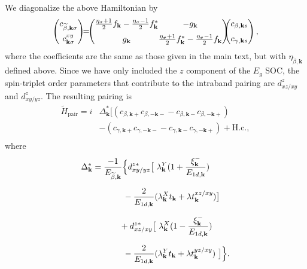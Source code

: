 \documentclass[%
reprint,
superscriptaddress,
 amsmath,amssymb,
 aps,
prb,
nobalancelastpage,
]{revtex4-2}
\begin{document}
We diagonalize the above Hamiltonian by
\begin{equation} \label{appendix_trsf}
\begin{aligned}
\begin{pmatrix}
   c_{\widetilde{\beta},\textbf{k}\sigma} \\[6pt]
   c^{xy}_{\textbf{k}\sigma} \\
 \end{pmatrix}\hspace{-1.5mm}
 \setlength\arraycolsep{0.01mm}
 = \hspace{-1.5mm}\begin{pmatrix} 
    \frac{\eta_{\sigma}+1}{2}f_{\textbf{k}}-\frac{\eta_{\sigma}-1}{2}f_{\textbf{k}}^{*} & -g_{\textbf{k}}  \\[6pt]
  g_{\textbf{k}} & \frac{\eta_{\sigma}+1}{2}f_{\textbf{k}}^{*}-\frac{\eta_{\sigma}-1}{2}f_{\textbf{k}}
\end{pmatrix}\hspace{-2.5mm}
\begin{pmatrix}
   c_{\beta,\textbf{k}s} \\[6pt]
   c_{\gamma,\textbf{k}s} \\
 \end{pmatrix},
\end{aligned}
\end{equation}
where the coefficients are the same as those given in the main text, but with $\eta_{\widetilde{\beta},\textbf{k}}$ defined above. Since we have only included the $z$ component of the $E_{g}$ SOC, the spin-triplet order parameters that contribute to the intraband pairing are $d_{xz/xy}^{z}$ and $d_{xy/yz}^{z}$. The resulting pairing is
\begin{equation}
\begin{aligned}
    \widetilde{H}_{\text{pair}} = i&\Delta_{\textbf{k}}^{*}\bigl[(c_{\beta,\textbf{k}+}c_{\beta,-\textbf{k}-} -c_{\beta,\textbf{k}-}c_{\beta,-\textbf{k}+}) \\[6pt]&- (c_{\gamma,\textbf{k}+}c_{\gamma,-\textbf{k}-} -c_{\gamma,\textbf{k}-}c_{\gamma,-\textbf{k}+}) + \text{H.c.},\\[6pt]
\end{aligned}
\end{equation}
where
\begin{equation}
\begin{aligned}
\Delta_{\textbf{k}}^{*} =\frac{-1}{E_{\widetilde{\beta},\textbf{k}}}\Big\{&d_{xy/yz}^{z*}\bigl[~\lambda_{\textbf{k}}^{Y}(1+\frac{\xi_{\textbf{k}}^{-}}{E_{1d,\textbf{k}}})\\[6pt]&\hspace{-2mm}-\frac{2}{E_{1d,\textbf{k}}}(\lambda_{\textbf{k}}^{X}t_{\textbf{k}} + \lambda t_{\textbf{k}}^{xz/xy})\bigr] \\[6pt]&\hspace{-3.5mm}+d_{xz/xy}^{z*}\bigl[~\lambda_{\textbf{k}}^{X}(1-\frac{\xi_{\textbf{k}}^{-}}{E_{1d,\textbf{k}}})\\[6pt]&\hspace{-2mm}-\frac{2}{E_{1d,\textbf{k}}}(\lambda_{\textbf{k}}^{Y}t_{\textbf{k}}+ \lambda t_{\textbf{k}}^{yz/xy})~\bigr]\Big\}.
\end{aligned}    
\end{equation}
\end{document}
